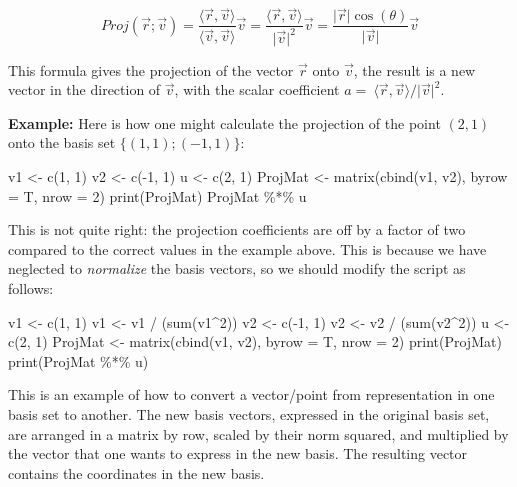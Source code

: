 \documentclass[
  letterpaper,
  DIV=11,
  numbers=noendperiod]{scrreprt}
\newenvironment{Shaded}{\begin{snugshade}}{\end{snugshade}}
\newcommand{\NormalTok}[1]{\textcolor[rgb]{0.00,0.23,0.31}{#1}}
\begin{document}
\[ 
Proj(\vec r ; \vec v) = \frac{ \langle \vec r , \vec v \rangle  } {\langle \vec v , \vec v \rangle } \vec v = \frac{ \langle \vec r ,  \vec v \rangle  } {\vert \vec v \vert^2} \vec v= \frac{  \vert\vec r\vert \cos(\theta) } {\vert \vec v \vert}\vec v
\]

This formula gives the projection of the vector \(\vec r\) onto
\(\vec v\), the result is a new vector in the direction of \(\vec v\),
with the scalar coefficient
\(a = \ \langle \vec r , \vec v \rangle /\vert \vec v \vert^2\).

\textbf{Example:} Here is how one might calculate the projection of the
point \((2,1)\) onto the basis set \(\{(1,1); (-1,1)\}\):

\begin{Shaded}
\begin{Highlighting}[]
\NormalTok{v1 \textless{}{-} c(1, 1)}
\NormalTok{v2 \textless{}{-} c({-}1, 1)}
\NormalTok{u \textless{}{-} c(2, 1)}
\NormalTok{ProjMat \textless{}{-} matrix(cbind(v1, v2), }
\NormalTok{                  byrow = T, nrow = 2)}
\NormalTok{print(ProjMat)}
\NormalTok{ProjMat \%*\% u}
\end{Highlighting}
\end{Shaded}

This is not quite right: the projection coefficients are off by a factor
of two compared to the correct values in the example above. This is
because we have neglected to \emph{normalize} the basis vectors, so we
should modify the script as follows:

\begin{Shaded}
\begin{Highlighting}[]
\NormalTok{v1 \textless{}{-} c(1, 1)}
\NormalTok{v1 \textless{}{-} v1 / (sum(v1\^{}2))}
\NormalTok{v2 \textless{}{-} c({-}1, 1)}
\NormalTok{v2 \textless{}{-} v2 / (sum(v2\^{}2))}
\NormalTok{u \textless{}{-} c(2, 1)}
\NormalTok{ProjMat \textless{}{-} matrix(cbind(v1, v2), }
\NormalTok{                  byrow = T, nrow = 2)}
\NormalTok{print(ProjMat)}
\NormalTok{print(ProjMat \%*\% u)}
\end{Highlighting}
\end{Shaded}

This is an example of how to convert a vector/point from representation
in one basis set to another. The new basis vectors, expressed in the
original basis set, are arranged in a matrix by row, scaled by their
norm squared, and multiplied by the vector that one wants to express in
the new basis. The resulting vector contains the coordinates in the new
basis.
\end{document}
